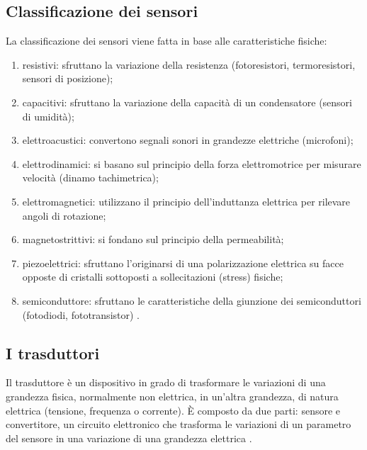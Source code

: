 \documentclass[a4paper]{report} %
\begin{document}
\subsection{Classificazione dei sensori}
La classificazione dei sensori viene fatta in base alle caratteristiche fisiche:
\begin{enumerate}
\item resistivi: sfruttano la variazione della resistenza (fotoresistori, termoresistori, sensori di posizione);
\item capacitivi: sfruttano la variazione della capacità di un condensatore (sensori di umidità);
\item elettroacustici: convertono segnali sonori in grandezze elettriche (microfoni);
\item elettrodinamici: si basano sul principio della forza elettromotrice per misurare velocità (dinamo tachimetrica);
\item elettromagnetici: utilizzano il principio dell'induttanza elettrica per rilevare angoli di rotazione;
\item magnetostrittivi: si fondano sul principio della permeabilità;
\item piezoelettrici: sfruttano l'originarsi di una polarizzazione elettrica su facce opposte di cristalli sottoposti a sollecitazioni (stress) fisiche;
\item semiconduttore: sfruttano le caratteristiche della giunzione dei semiconduttori (fotodiodi, fototransistor) \cite{art:rif.11}. 
\end{enumerate}

\subsection{I trasduttori}
Il trasduttore è un dispositivo in grado di trasformare le variazioni di una grandezza fisica,
normalmente non elettrica, in un'altra grandezza, di natura elettrica (tensione, frequenza o corrente). È composto da due parti: sensore e convertitore, un circuito elettronico che trasforma le variazioni di un parametro del sensore in una variazione di una grandezza elettrica \cite{art:rif.10}. 
\end{document}
